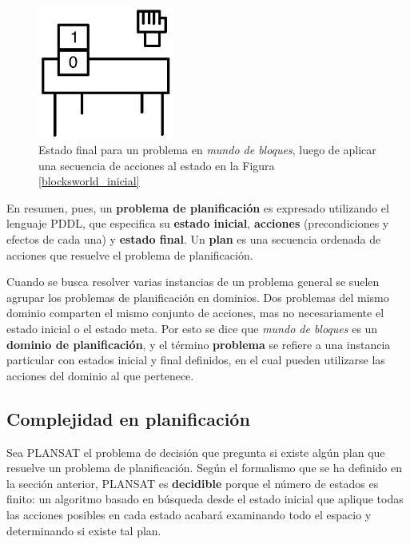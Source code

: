\begin{figure}[h!]
\centering
\includegraphics[width=0.4\textwidth]{figuras/blocksworld_final.png}
\caption[Estado final en \textit{mundo de bloques}]{Estado final para un problema en \textit{mundo de bloques},
luego de aplicar una secuencia de acciones al estado en la Figura
\ref{blocksworld_inicial}}
\label{blocksworld_final}
\end{figure}

En resumen, pues, un \textbf{problema de planificación} es expresado utilizando
el lenguaje PDDL, que especifica su \textbf{estado inicial}, \textbf{acciones}
(precondiciones y efectos de cada una) y \textbf{estado final}.
Un \textbf{plan} es una secuencia ordenada de acciones que resuelve el problema
de planificación.

Cuando se busca resolver varias instancias de un problema general se suelen
agrupar los problemas de planificación en dominios. Dos problemas del mismo
dominio comparten el mismo conjunto de acciones, mas no necesariamente el
estado inicial o el estado meta. Por esto se dice que \textit{mundo de bloques}
es un \textbf{dominio de planificación}, y el término \textbf{problema} se refiere a
una instancia particular con estados inicial y final definidos, en
el cual pueden utilizarse las acciones del dominio al que pertenece.

\subsection{Complejidad en planificación}
\label{complejidad_planificacion}
Sea PLANSAT el problema de decisión que pregunta si existe algún plan que
resuelve un problema de planificación. Según el formalismo que se ha definido
en la sección anterior,
PLANSAT es \textbf{decidible} porque el número de estados es finito:
un algoritmo basado en búsqueda desde el estado inicial que aplique
todas las acciones posibles en cada estado acabará examinando todo el espacio y
determinando si existe tal plan.

